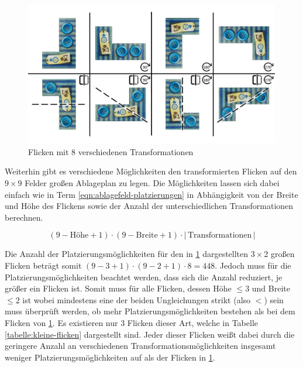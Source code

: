 \begin{figure}[!ht]
    \centering
    \includegraphics[width=0.995\textwidth]{res/pictures/dihedral-group.pdf}
    \vspace*{-0.5cm}
    \caption{Flicken mit 8 verschiedenen Transformationen}
    \label{fig:diedergruppe}
\end{figure}

Weiterhin gibt es verschiedene Möglichkeiten den transformierten Flicken auf den $9\times9$ Felder großen Ablageplan zu legen. Die Möglichkeiten lassen sich dabei einfach wie in Term \ref{eqn:ablagefeld-platzierungen} in Abhängigkeit von der Breite und Höhe des Flickens sowie der Anzahl der unterschiedlichen Transformationen berechnen.

\vspace*{-0.45cm}
\begin{equation}
    \label{eqn:ablagefeld-platzierungen}
    \left( 9 - \text{Höhe}  + 1 \right) \cdot
    \left( 9 - \text{Breite} + 1 \right) \cdot
    \left\lvert\, \text{Transformationen} \,\right\rvert
\end{equation}

Die Anzahl der Platzierungsmöglichkeiten für den in \ref{fig:diedergruppe} dargestellten $3\times 2$ großen Flicken beträgt somit $\left( 9 - 3 + 1 \right) \cdot \left( 9 - 2 + 1 \right) \cdot 8 = 448$. Jedoch muss für die Platzierungsmöglichkeiten beachtet werden, dass sich die Anzahl reduziert, je größer ein Flicken ist. Somit muss für alle Flicken, dessen Höhe $\le 3$ und Breite $\le 2$ ist \textemdash{} wobei mindestens eine der beiden Ungleichungen strikt (also $<$) sein muss \textemdash{} überprüft werden, ob mehr Platzierungsmöglichkeiten bestehen als bei dem Flicken von \ref{fig:diedergruppe}. Es existieren nur 3 Flicken dieser Art, welche in Tabelle \ref{tabelle:kleine-flicken} dargestellt sind. Jeder dieser Flicken weißt dabei durch die geringere Anzahl an verschiedenen Transformationsmöglichkeiten insgesamt weniger Platzierungsmöglichkeiten auf als der Flicken in \ref{fig:diedergruppe}.

